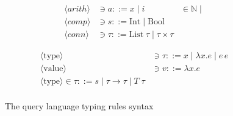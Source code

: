 


\begin{figure}
    \centering
    \begin{minipage}[t]{0.45\textwidth}
        \centering
        \begin{align*}
            \langle arith \rangle &\ni a ::= x \;|\; i &\in \mathbb{N}  \;|\; \\
            \langle comp \rangle &\ni s ::= \text{Int} \;|\; \text{Bool} \\
            \langle conn \rangle &\ni \tau ::= \text{List}\;\tau \;|\; \tau \times \tau
        \end{align*}
    \end{minipage}
    \hfill
    \begin{minipage}[t]{0.45\textwidth}
        \centering
        \begin{align*}
            \langle \text{type} \rangle &\ni \tau ::= x \;|\; \lambda x.e \;|\; e\,e \\
            \langle \text{value} \rangle &\ni v ::= \lambda x.e \\
            \langle \text{type} \rangle \in \tau ::= s \;|\; \tau \rightarrow \tau \;|\; T\;\tau \\
        \end{align*}
    \end{minipage}
    \caption{The \vnnlib{} query language typing rules syntax}
    \label{fig:vnnlib_typing_syntax}
\end{figure}


